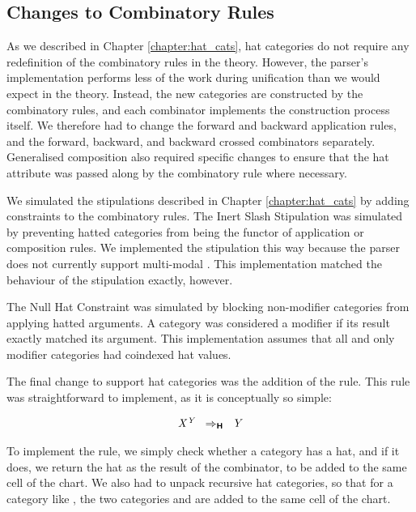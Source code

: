 \subsection{Changes to Combinatory Rules}
\label{sec:combinator_implementation}
As we described in Chapter \ref{chapter:hat_cats}, hat categories do not require
any redefinition of the combinatory rules in the theory. However, the \candc
parser's implementation performs less of the work during unification than we
would expect in the theory. Instead, the new categories are constructed by the
combinatory rules, and each combinator implements the construction process
itself. We therefore had to change the forward and backward application rules,
and the forward, backward, and backward crossed combinators separately.
Generalised composition also required specific changes to ensure that
the hat attribute was passed along by the combinatory
rule where necessary.

We simulated the stipulations described in Chapter \ref{chapter:hat_cats} by
adding constraints to the combinatory rules. The Inert Slash Stipulation was
simulated by preventing hatted categories from being the functor of application
or composition rules. We implemented the stipulation this way because the \candc
parser does not currently support multi-modal \ccg. This implementation matched the
behaviour of the stipulation exactly, however.

The Null Hat Constraint was simulated by blocking non-modifier categories from applying
hatted arguments. A category was considered a modifier if its result exactly matched its
argument. This implementation assumes that all and only modifier categories had coindexed
hat values.

The final change to support hat categories was the addition of the
 rule. This rule was straightforward to implement, as it is
conceptually so simple:

\begin{eqnarray}
\mbox{$\it{\mbox{$\it{X^Y}$}}$} \;\;\Rightarrow_\textbf{\textsf{H}}\;\; \mbox{$\it{Y}$}
\end{eqnarray}


To implement the rule, we simply check whether a category has a hat, and if it
does, we return the hat as the result of the combinator, to be added to the same
cell of the chart. We also had to unpack recursive hat categories, so that for a
category like , the two categories  and 
are added to the same cell of the chart.



